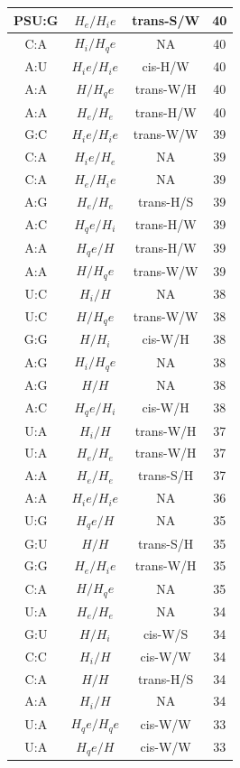 \begin{center}
\begin{longtable}{c|c|c|c}
PSU:G & $H_e/H_ie$ & trans-S/W & 40 \\  \hline
C:A & $H_i/H_qe$ & NA & 40 \\  \hline
A:U & $H_ie/H_ie$ & cis-H/W & 40 \\  \hline
A:A & $H/H_qe$ & trans-W/H & 40 \\  \hline
A:A & $H_e/H_e$ & trans-H/W & 40 \\  \hline
G:C & $H_ie/H_ie$ & trans-W/W & 39 \\  \hline
C:A & $H_ie/H_e$ & NA & 39 \\  \hline
C:A & $H_e/H_ie$ & NA & 39 \\  \hline
A:G & $H_e/H_e$ & trans-H/S & 39 \\  \hline
A:C & $H_qe/H_i$ & trans-H/W & 39 \\  \hline
A:A & $H_qe/H$ & trans-H/W & 39 \\  \hline
A:A & $H/H_qe$ & trans-W/W & 39 \\  \hline
U:C & $H_i/H$ & NA & 38 \\  \hline
U:C & $H/H_qe$ & trans-W/W & 38 \\  \hline
G:G & $H/H_i$ & cis-W/H & 38 \\  \hline
A:G & $H_i/H_qe$ & NA & 38 \\  \hline
A:G & $H/H$ & NA & 38 \\  \hline
A:C & $H_qe/H_i$ & cis-W/H & 38 \\  \hline
U:A & $H_i/H$ & trans-W/H & 37 \\  \hline
U:A & $H_e/H_e$ & trans-W/H & 37 \\  \hline
A:A & $H_e/H_e$ & trans-S/H & 37 \\  \hline
A:A & $H_ie/H_ie$ & NA & 36 \\  \hline
U:G & $H_qe/H$ & NA & 35 \\  \hline
G:U & $H/H$ & trans-S/H & 35 \\  \hline
G:G & $H_e/H_ie$ & trans-W/H & 35 \\  \hline
C:A & $H/H_qe$ & NA & 35 \\  \hline
U:A & $H_e/H_e$ & NA & 34 \\  \hline
G:U & $H/H_i$ & cis-W/S & 34 \\  \hline
C:C & $H_i/H$ & cis-W/W & 34 \\  \hline
C:A & $H/H$ & trans-H/S & 34 \\  \hline
A:A & $H_i/H$ & NA & 34 \\  \hline
U:A & $H_qe/H_qe$ & cis-W/W & 33 \\  \hline
U:A & $H_qe/H$ & cis-W/W & 33 \\  \hline

\end{longtable}
\end{center}
